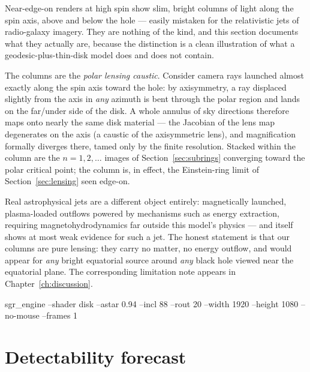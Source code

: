 Near-edge-on renders at high spin show slim, bright columns of light
along the spin axis, above and below the hole — easily mistaken for the
relativistic jets of radio-galaxy imagery. They are nothing of the
kind, and this section documents what they actually are, because the
distinction is a clean illustration of what a geodesic-plus-thin-disk
model does and does not contain.

The columns are the \emph{polar lensing caustic}. Consider camera rays
launched almost exactly along the spin axis toward the hole: by
axisymmetry, a ray displaced slightly from the axis in \emph{any}
azimuth is bent through the polar region and lands on the far/under
side of the disk. A whole annulus of sky directions therefore maps onto
nearly the same disk material — the Jacobian of the lens map degenerates
on the axis (a caustic of the axisymmetric lens), and magnification
formally diverges there, tamed only by the finite resolution. Stacked
within the column are the $n = 1, 2, \dots$ images of
Section~\ref{sec:subrings} converging toward the polar critical point;
the column is, in effect, the Einstein-ring limit of
Section~\ref{sec:lensing} seen edge-on.

Real astrophysical jets are a different object entirely: magnetically
launched, plasma-loaded outflows powered by mechanisms such as
\citet{BlandfordZnajek1977} energy extraction, requiring
magnetohydrodynamics far outside this model's physics — and \sgra{}
itself shows at most weak evidence for such a jet. The honest statement
is that our columns are pure lensing: they carry no matter, no energy
outflow, and would appear for \emph{any} bright equatorial source around
\emph{any} black hole viewed near the equatorial plane. The
corresponding limitation note appears in Chapter~\ref{ch:discussion}.

%
{sgr\_engine --shader disk --astar 0.94 --incl 88 --rout 20 --width
1920 --height 1080 --no-mouse --frames 1}

\section{Detectability forecast}
\label{sec:ngeht}

